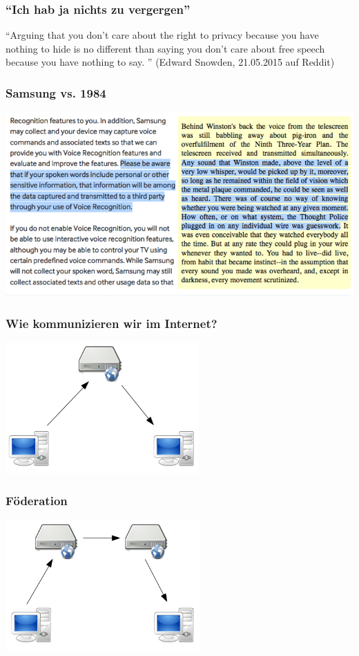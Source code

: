 \documentclass[12pt]{beamer}
\begin{document}
\begin{frame}
    \frametitle{``Ich hab ja nichts zu vergergen''}
    \begin{center}
      ``Arguing that you don't care about the right to privacy because you have nothing to hide is no different than saying you don't care about free speech because you have nothing to say. ''
      (Edward Snowden, 21.05.2015 auf Reddit)
    \end{center}
\end{frame}

\begin{frame}
    \frametitle{Samsung vs. 1984}
    \begin{center}
      \includegraphics[height=0.7\textheight]{img/samsung-1984.png}
    \end{center}
\end{frame}


\begin{frame}
    \frametitle{Wie kommunizieren wir im Internet?}
    \begin{center}
      \includegraphics[height=5cm]{img/c-s.png}
    \end{center}
\end{frame}

\begin{frame}
    \frametitle{Föderation}
    \begin{center}
      \includegraphics[height=5cm]{img/fed.png}
    \end{center}
\end{frame}
\end{document}
